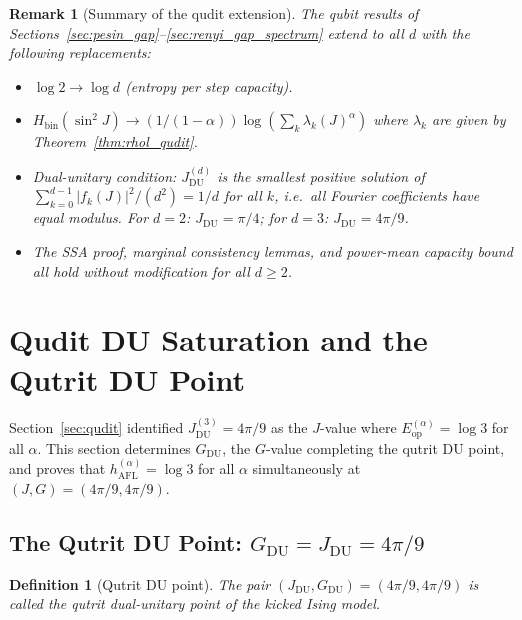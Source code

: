 \documentclass[12pt,a4paper]{article}
\newtheorem{definition}[theorem]{Definition}
\newtheorem{remark}[theorem]{Remark}
\begin{document}
\begin{remark}[Summary of the qudit extension]
The qubit results of Sections~\ref{sec:pesin_gap}--\ref{sec:renyi_gap_spectrum}
extend to all $d$ with the following replacements:
\begin{itemize}
\item $\log 2 \to \log d$ (entropy per step capacity).
\item $H_{\mathrm{bin}}(\sin^{2}\!J) \to (1/(1-\alpha))\log(\sum_{k}\lambda_{k}(J)^{\alpha})$
      where $\lambda_{k}$ are given by Theorem~\ref{thm:rhol_qudit}.
\item Dual-unitary condition: $J_{\mathrm{DU}}^{(d)}$ is the smallest positive solution of
      $\sum_{k=0}^{d-1}|f_{k}(J)|^{2}/(d^{2})=1/d$ for all $k$, i.e.\ all Fourier coefficients
      have equal modulus.  For $d=2$: $J_{\mathrm{DU}}=\pi/4$; for $d=3$: $J_{\mathrm{DU}}=4\pi/9$.
\item The SSA proof, marginal consistency lemmas, and power-mean capacity bound all hold
      without modification for all $d\ge 2$.
\end{itemize}
\end{remark}

\section{Qudit DU Saturation and the Qutrit DU Point}\label{sec:qudit_du}

Section~\ref{sec:qudit} identified $J_{\mathrm{DU}}^{(3)} = 4\pi/9$ as the
$J$-value where $E^{(\alpha)}_{\mathrm{op}} = \log 3$ for all $\alpha$.
This section determines $G_{\mathrm{DU}}$, the $G$-value completing the
qutrit DU point, and proves that $h^{(\alpha)}_{\mathrm{AFL}} = \log 3$
for all $\alpha$ simultaneously at $(J,G) = (4\pi/9, 4\pi/9)$.

\subsection{The Qutrit DU Point: $G_{\mathrm{DU}} = J_{\mathrm{DU}} = 4\pi/9$}

\begin{definition}[Qutrit DU point]
The pair $(J_{\mathrm{DU}}, G_{\mathrm{DU}}) = (4\pi/9, 4\pi/9)$ is called
the \emph{qutrit dual-unitary point} of the kicked Ising model.
\end{definition}
\end{document}
